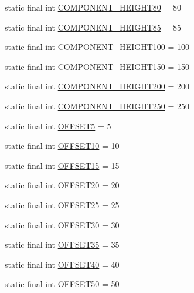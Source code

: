 \begin{DoxyCompactItemize}
\item 
static final int \hyperlink{class_display_1_1_display_a4c13bfab8bd26ca8047bef940fae492c}{C\+O\+M\+P\+O\+N\+E\+N\+T\+\_\+\+H\+E\+I\+G\+H\+T80} = 80
\item 
static final int \hyperlink{class_display_1_1_display_a6e40ee081336c35e765e4e880d4e5d8b}{C\+O\+M\+P\+O\+N\+E\+N\+T\+\_\+\+H\+E\+I\+G\+H\+T85} = 85
\item 
static final int \hyperlink{class_display_1_1_display_ad07d0c4e939eca556947af196fd4b6a0}{C\+O\+M\+P\+O\+N\+E\+N\+T\+\_\+\+H\+E\+I\+G\+H\+T100} = 100
\item 
static final int \hyperlink{class_display_1_1_display_aee9bc1bb183f9dfc04267a7cdca2b524}{C\+O\+M\+P\+O\+N\+E\+N\+T\+\_\+\+H\+E\+I\+G\+H\+T150} = 150
\item 
static final int \hyperlink{class_display_1_1_display_a880d1f86d07c77332fa8015e1b7a5145}{C\+O\+M\+P\+O\+N\+E\+N\+T\+\_\+\+H\+E\+I\+G\+H\+T200} = 200
\item 
static final int \hyperlink{class_display_1_1_display_afbd2f610599f4393a4c30314c28ab73b}{C\+O\+M\+P\+O\+N\+E\+N\+T\+\_\+\+H\+E\+I\+G\+H\+T250} = 250
\item 
static final int \hyperlink{class_display_1_1_display_a265426fc52f9fc0f3cf08691bf8fc8bc}{O\+F\+F\+S\+E\+T5} = 5
\item 
static final int \hyperlink{class_display_1_1_display_a43bf93ef0872de87948d181590683656}{O\+F\+F\+S\+E\+T10} = 10
\item 
static final int \hyperlink{class_display_1_1_display_a3fb4f586318e61f3ad9d15d058ce15b8}{O\+F\+F\+S\+E\+T15} = 15
\item 
static final int \hyperlink{class_display_1_1_display_a2969279ab92fa68405072414fa62c987}{O\+F\+F\+S\+E\+T20} = 20
\item 
static final int \hyperlink{class_display_1_1_display_af6173975e03ce9913d8935d6f8040e5b}{O\+F\+F\+S\+E\+T25} = 25
\item 
static final int \hyperlink{class_display_1_1_display_afbede7d7429e2ed899ae713864da8848}{O\+F\+F\+S\+E\+T30} = 30
\item 
static final int \hyperlink{class_display_1_1_display_a9b88a4d575cdcdcfe550deeac1c147f4}{O\+F\+F\+S\+E\+T35} = 35
\item 
static final int \hyperlink{class_display_1_1_display_a6c71cd05e79a2e66cac7ac49d8a627b0}{O\+F\+F\+S\+E\+T40} = 40
\item 
static final int \hyperlink{class_display_1_1_display_aab4544411ff6ce57f68415f53c73e2dc}{O\+F\+F\+S\+E\+T50} = 50
\end{DoxyCompactItemize}
